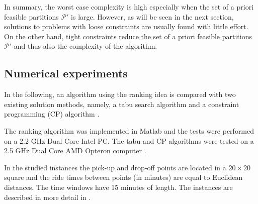 \documentclass[dissertation,draft*]{aaltoseries}
\begin{document}
% 

In summary, the worst case complexity is high especially when the set of a priori feasible partitions $\mathcal{P}'$ is large. 
However, as will be seen in the next section, solutions to problems with loose constraints are usually found with little effort. 
On the other hand, tight constraints reduce the set of a priori feasible partitions $\mathcal{P}'$ 
and thus also the complexity of the algorithm.


\subsection{Numerical experiments}
\label{mvexperience}
In the following, an algorithm using the ranking idea is compared with two existing solution methods,
namely, a tabu search algorithm \citep{cordeau02} and
a constraint programming (CP) algorithm \citep{berbegliafeas}. 

The ranking algorithm was implemented in Matlab and the tests were performed on a 2.2 GHz Dual Core Intel PC. 
The tabu and CP algorithms were tested on a 2.5 GHz Dual Core AMD Opteron computer \citep{berbegliathesis}. 

In the studied instances the pick-up and drop-off points are located in a $20 \times 20$ square and the 
ride times between points (in minutes) are equal to Euclidean distances. The time windows
have 15 minutes of length. 
The instances are described in more detail in \citep{cordeau01,ropke2007,berbegliafeas}.
\end{document}
